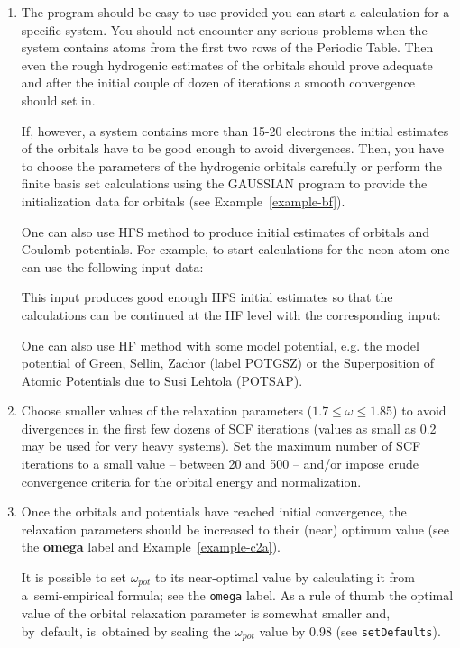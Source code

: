 \documentclass[12pt,a4paper]{article}
\newcommand{\ft}[1]{\texttt{#1}}
\begin{document}
\begin{enumerate}
\item The program should be easy to use provided you can start a
  calculation for a specific system. You should not encounter any
  serious problems when the system contains atoms from the first two
  rows of the Periodic Table. Then even the rough hydrogenic estimates
  of the orbitals should prove adequate and after the initial couple
  of dozen of iterations a smooth convergence should set in.

  If, however, a system contains more than 15-20 electrons the initial
  estimates of the orbitals have to be good enough to avoid
  divergences. Then, you have to choose the parameters of the
  hydrogenic orbitals carefully or perform the finite basis set
  calculations using the GAUSSIAN program to provide the
  initialization data for orbitals (see Example~\ref{example-bf}).

  One can also use HFS method to produce initial estimates of orbitals
  and Coulomb potentials. For example, to start calculations for the
  neon atom one can use the following input data:

  

  This input produces good enough HFS initial estimates so that the
  calculations can be continued at the HF level with the corresponding
  input:

  

  One can also use HF method with some model potential, e.g. the model potential of Green,
  Sellin, Zachor (label POTGSZ) or the Superposition of Atomic Potentials due to Susi
  Lehtola (POTSAP).

\item Choose smaller values of the relaxation parameters ($1.7\leq
  \omega\leq 1.85$) to avoid divergences in the first few dozens of
  SCF iterations (values as small as 0.2 may be used for very heavy
  systems). Set the maximum number of SCF iterations to a small value
  -- between 20 and 500 -- and/or impose crude convergence criteria
  for the orbital energy and normalization.

\item Once the orbitals and potentials have reached initial
  convergence, the relaxation parameters should be increased to their
  (near) optimum value (see the \textbf{omega} label and
  Example~\ref{example-c2a}).

  It is possible to set $\omega_{pot}$ to its near-optimal value by
  calculating it from a~semi-empirical formula; see the \ft{omega}
  label. As a rule of thumb the optimal value of the orbital
  relaxation parameter is somewhat smaller and, by~default,
  is~obtained by scaling the $\omega_{pot}$ value by 0.98 (see
  \ft{setDefaults}).



\end{enumerate}
\end{document}
